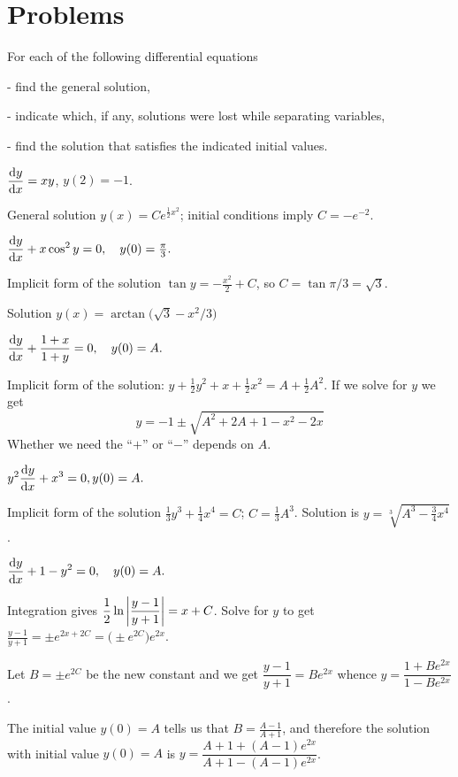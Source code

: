 \section{Problems} %
\problemfont %
\begin{multicols}{2}
For each of the following differential equations
\begin{trivlist}
\item [-] find the general solution,
\item [-] indicate which, if any, solutions were lost while separating variables,
\item [-] find the solution that satisfies the indicated initial values.
\end{trivlist}

\problem $\displaystyle \frac{\mathrm{d} y} {\mathrm{d} x} = xy$, \quad $y(2) = -1$. %

\answer %
General solution $y(x) = Ce^{\frac12 x^2}$; initial conditions imply $C=-e^{-2}$.  
\endanswer

\problem \(\displaystyle \frac{\mathrm{d} y}{\mathrm{d} x} + x\cos^2y =0,\quad y(0)=\tfrac\pi3.  \) %

\answer %
Implicit form of the solution $\tan y = -\frac{x^2}{2}+C$, so $C=
\tan\pi/3 = \sqrt3$.

Solution $y(x) = \arctan\bigl(\sqrt3 - x^2/3\bigr)$
\endanswer

\problem \(\displaystyle \frac{\mathrm{d} y}{\mathrm{d} x} + \frac{1+x}{1+y} =0,\quad y(0)=A.  \) %

\answer %
Implicit form of the solution: $y+\frac12y^2 +x+\tfrac12x^2 =
A+\tfrac12A^2$.  If we solve for $y$ we get
\[
y = -1\pm \sqrt{A^2+2A+1-x^2-2x}
\]
Whether we need the ``$+$'' or ``$-$'' depends on $A$.
\endanswer


\problem \(\displaystyle y^2\frac{\mathrm{d} y}{\mathrm{d} x} + x^3 =0, y(0)=A.  \) %

\answer %
Implicit form of the solution $\frac13y^3+\frac14x^4 = C$;
$C=\frac{1}{3}A^3$.  Solution is $y = \sqrt[3]{A^3-\frac34 x^4}$.
\endanswer

\problem \(\displaystyle \frac{\mathrm{d} y}{\mathrm{d} x} + 1 - y^2 =0,\quad y(0)=A.  \) %

\answer %
Integration gives $\displaystyle \frac12\ln\left|\frac{y-1}{y+1}\right| = x+C$.
Solve for $y$ to get $\frac{y-1}{y+1} = \pm e^{2x+2C} = \bigl(\pm
e^{2C}\bigr)e^{2x}$.

Let $B= \pm e^{2C}$ be the new constant and we get $\dfrac{y-1}{y+1} =
Be^{2x}$ whence $y = \dfrac{1+Be^{2x}}{1-Be^{2x}}$.

The initial value $y(0)=A$ tells us that $B = \frac{A-1}{A+1}$, and
therefore the solution with initial value $y(0) = A$ is $y =
\dfrac{A+1 + (A-1)e^{2x}}{A+1-(A-1)e^{2x}}$.
\endanswer


\end{multicols}
